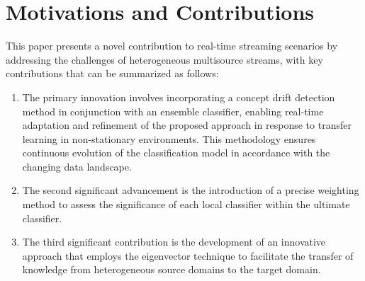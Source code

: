 \section{Motivations and Contributions} \label{sec:4_2_motivation}
This paper presents a novel contribution to real-time streaming scenarios by addressing the challenges of heterogeneous multisource streams, with key contributions that can be summarized as follows:
\begin{enumerate}[nosep]
  \item The primary innovation involves incorporating a concept drift detection method in conjunction with an ensemble classifier, enabling real-time adaptation and refinement of the proposed approach in response to transfer learning in non-stationary environments. This methodology ensures continuous evolution of the classification model in accordance with the changing data landscape.
  \item The second significant advancement is the introduction of a precise weighting method to assess the significance of each local classifier within the ultimate classifier.
 \item The third significant contribution is the development of an innovative approach that employs the eigenvector technique to facilitate the transfer of knowledge from heterogeneous source domains to the target domain.
  \end{enumerate} 
 
   

